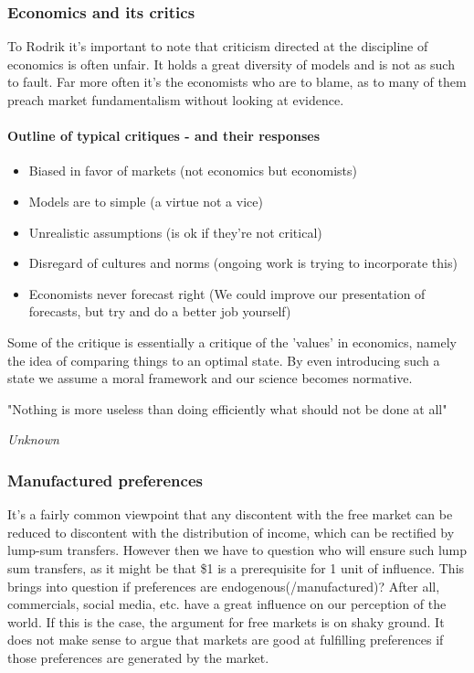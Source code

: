 \documentclass[12pt, a4paper]{article}
\begin{document}
\begin{multicols}{2}
\subsubsection{Economics and its critics}
To Rodrik it's important to note that criticism directed at the discipline of economics is often unfair. It holds a great diversity of models and is not as such to fault. Far more often it's the economists who are to blame, as to many of them preach market fundamentalism without looking at evidence. 
\paragraph{Outline of typical critiques - and their responses}
\begin{itemize}
\item Biased in favor of markets (not economics but economists)
\item Models are to simple (a virtue not a vice)
\item Unrealistic assumptions (is ok if they're not critical)
\item Disregard of cultures and norms (ongoing work is trying to incorporate this)
\item Economists never forecast right (We could improve our presentation of forecasts, but try and do a better job yourself)
\end{itemize}
Some of the critique is essentially a critique of the 'values' in economics, namely the idea of comparing things to an optimal state. By even introducing such a state we assume a moral framework and our science becomes normative. 

\epigraph{"Nothing is more useless than doing efficiently what should not be done at all"}{\textit{Unknown}}

\subsubsection{Manufactured preferences}
It's a fairly common viewpoint that any discontent with the free market can be reduced to discontent with the distribution of income, which can be rectified by lump-sum transfers. However then we have to question who will ensure such lump sum transfers, as it might be that \$1 is a prerequisite for 1 unit of influence.
This brings into question if preferences are endogenous(/manufactured)? After all, commercials, social media, etc. have a great influence on our perception of the world. If this is the case, the argument for free markets is on shaky ground. It does not make sense to argue that markets are good at fulfilling preferences if those preferences are generated by the market. 


\end{multicols}
\end{document}
